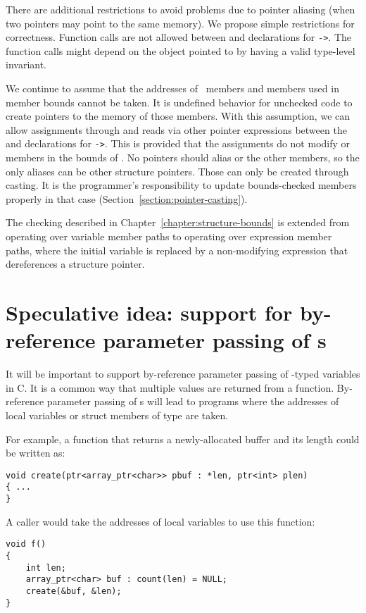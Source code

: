 There are additional restrictions to avoid problems due to pointer aliasing 
(when two pointers may point to the same memory).   We propose simple restrictions
for correctness.
Function calls are not allowed between  and 
 declarations for \texttt{->}.  The function calls 
might depend on the object pointed to by  having a  valid type-level invariant.
  
We continue to assume that the addresses of \arrayptr\ members and members
used in member bounds cannot be taken.  It is undefined behavior for unchecked
code to create pointers to the memory of those members.   With this assumption, we 
can allow assignments through and reads via other pointer expressions
between the  and  declarations for
\texttt{->}.  This is provided that the assignments do not modify 
 or members in the bounds of .  No pointers should alias
 or the other members, so the only aliases can be other structure
pointers.  Those can only be created through casting.  It is the programmer's responsibility
to update bounds-checked members properly in that case (Section~\ref{section:pointer-casting}).

The checking described in Chapter~\ref{chapter:structure-bounds} is extended from
operating over variable member paths to operating over expression member paths, where
the initial variable is replaced by a non-modifying expression that dereferences a structure
pointer.

\section{Speculative idea: support for by-reference parameter passing of \protect\arrayptr s}

It will be important to support by-reference parameter passing of \arrayptr-typed variables
in C.  It is a common way that multiple values are returned from a function.  By-reference parameter
passing of \arrayptr s will lead to programs where the addresses of local variables or struct
members of type \arrayptr are taken.

For example, a function that returns a newly-allocated buffer and its length could be written as:
\begin{verbatim}
void create(ptr<array_ptr<char>> pbuf : *len, ptr<int> plen)
{ ...
}
\end{verbatim}
A caller would take the addresses of local variables to use this function:
\begin{verbatim}
void f()
{
    int len;
    array_ptr<char> buf : count(len) = NULL;
    create(&buf, &len);
}
\end{verbatim}

